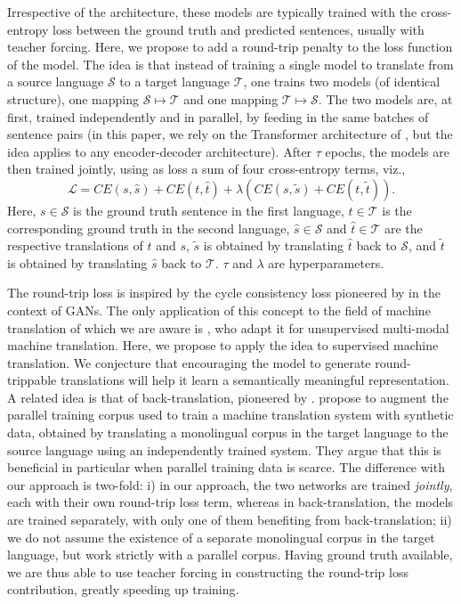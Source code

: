\documentclass[11pt,a4paper]{article}
\begin{document}
Irrespective of the architecture, these models are typically trained with the cross-entropy loss between the ground truth and predicted sentences, usually with teacher forcing.
Here, we propose to add a round-trip penalty to the loss function of the model. The idea is that instead of training a single model to translate from a source language $\mathcal{S}$ to a target language $\mathcal{T}$, one trains two models (of identical structure), one mapping $\mathcal{S}\mapsto \mathcal{T}$ and one mapping $\mathcal{T}\mapsto \mathcal{S}$. The two models are, at first, trained independently and in parallel, by feeding in the same batches of sentence pairs (in this paper, we rely on the Transformer architecture of \citet{transformer}, but the idea applies to any encoder-decoder architecture). After $\tau$ epochs, the models are then trained jointly, using as loss a sum of four cross-entropy terms, viz.,
\begin{equation}
\mathcal{L} = CE(s, \hat{s}) + CE(t, \hat{t}) + \lambda \left( CE(s, \tilde{s}) + CE(t, \tilde{t})\right).
\label{eq:RTL}
\end{equation}
Here, $s\in\mathcal{S}$ is the ground truth sentence in the first language, $t\in\mathcal{T}$ is the corresponding ground truth in the second language, $\hat{s}\in\mathcal{S}$ and $\hat{t}\in\mathcal{T}$ are the respective translations of $t$ and $s$, $\tilde{s}$ is obtained by translating $\hat{t}$ back to $\mathcal{S}$, and $\tilde{t}$ is obtained by translating $\hat{s}$ back to $\mathcal{T}$. $\tau$ and $\lambda$ are hyperparameters.

The round-trip loss is inspired by the cycle consistency loss pioneered by \citet{CycleGAN2017} in the context of GANs. The only application of this concept to the field of machine translation of which we are aware is \citet{su:2018}, who adapt it for unsupervised multi-modal machine translation. Here, we propose to apply the idea to supervised machine translation. We conjecture that encouraging the model to generate round-trippable translations will help it learn a semantically meaningful representation. A related idea is that of back-translation, pioneered by \citet{backtrans}. \citeauthor{backtrans} propose to augment the parallel training corpus used to train a machine translation system with synthetic data, obtained by translating a monolingual corpus in the target language to the source language using an independently trained system. They argue that this is beneficial in particular when parallel training data is scarce. The difference with our approach is two-fold: i) in our approach, the two networks are trained \emph{jointly}, each with their own round-trip loss term, whereas in back-translation, the models are trained separately, with only one of them benefiting from back-translation; ii) we do not assume the existence of a separate monolingual corpus in the target language, but work strictly with a parallel corpus. Having ground truth available, we are thus able to use teacher forcing in constructing the round-trip loss contribution, greatly speeding up training.
\end{document}
